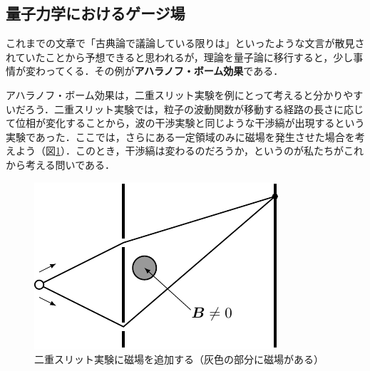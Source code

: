 \documentclass[a4paper,pdflatex,ja=standard]{bxjsarticle}
\begin{document}
\subsection{量子力学におけるゲージ場}

これまでの文章で「古典論で議論している限りは」といったような文言が散見されていたことから予想できると思われるが，理論を量子論に移行すると，少し事情が変わってくる．その例が\textbf{アハラノフ・ボーム効果}である．

アハラノフ・ボーム効果は，二重スリット実験を例にとって考えると分かりやすいだろう．二重スリット実験では，粒子の波動関数が移動する経路の長さに応じて位相が変化することから，波の干渉実験と同じような干渉縞が出現するという実験であった．ここでは，さらにある一定領域のみに磁場を発生させた場合を考えよう（図\ref{two_slit}）．このとき，干渉縞は変わるのだろうか，というのが私たちがこれから考える問いである．

\begin{figure}[ht]
  \centering
  \includegraphics{fig/two_slit.pdf}
  \caption{二重スリット実験に磁場を追加する（灰色の部分に磁場がある）}
  \label{two_slit}
\end{figure}
\end{document}
